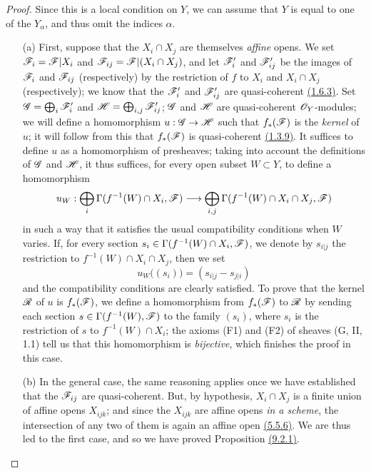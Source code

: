 \begin{proof}
\label{proof-prop-1.9.2.1}
Since this is a local condition on $Y$, we can assume that $Y$ is equal to one
of the $Y_\alpha$, and thus omit the indices $\alpha$.

\begin{itemize}
  \item[(a)] First, suppose that the $X_i\cap X_j$
    are themselves {\em affine} opens. We set $\mathscr{F}_i=\mathscr{F}|X_i$ and
    $\mathscr{F}_{ij}=\mathscr{F}|(X_i\cap X_j)$, and let $\mathscr{F}'_i$ and
    $\mathscr{F}'_{ij}$ be the images of $\mathscr{F}_i$ and $\mathscr{F}_{ij}$
    (respectively) by the restriction of $f$ to $X_i$ and $X_i\cap X_j$
    (respectively); we know that the $\mathscr{F}'_i$ and $\mathscr{F}'_{ij}$ are
    quasi-coherent \hyperref[prop-1.1.6.3]{(1.6.3)}. Set $\mathscr{G}=\bigoplus_i\mathscr{F}'_i$ and
    $\mathscr{H}=\bigoplus_{i,j}\mathscr{F}'_{ij}$; $\mathscr{G}$ and $\mathscr{H}$ are
    quasi-coherent $\mathscr{O}_Y$-modules; we will define a homomorphism
    $u:\mathscr{G}\to\mathscr{H}$ such that $f_*(\mathscr{F})$ is the
    {\em kernel} of $u$; it will follow from this that $f_*(\mathscr{F})$ is
    quasi-coherent \hyperref[cor-1.1.3.9]{(1.3.9)}. It suffices to define $u$ as
    a homomorphism of presheaves; taking into account the definitions of $\mathscr{G}$
    and $\mathscr{H}$, it thus suffices, for every open subset $W\subset Y$, to define a
    homomorphism
    \[
      u_W:\bigoplus_i\Gamma(f^{-1}(W)\cap X_i,\mathscr{F})
      \longrightarrow\bigoplus_{i,j}\Gamma(f^{-1}(W)\cap X_i\cap X_j,\mathscr{F})
    \]
    in such a way that it satisfies the usual compatibility conditions when $W$
    varies. If, for every section $s_i\in\Gamma(f^{-1}(W)\cap X_i,\mathscr{F})$, we
    denote by $s_{i|j}$ the restriction to $f^{-1}(W)\cap X_i\cap X_j$, then we set
    \[
      u_W\big((s_i)\big)=(s_{i|j}-s_{j|i})
    \]
    and the compatibility conditions are clearly satisfied. To prove that the kernel
    $\mathscr{R}$ of $u$ is $f_*(\mathscr{F})$, we define a homomorphism from $f_*(\mathscr{F})$ to
    $\mathscr{R}$ by sending each section $s\in\Gamma(f^{-1}(W),\mathscr{F})$ to the family
    $(s_i)$, where $s_i$ is the restriction of $s$ to $f^{-1}(W)\cap X_i$; the
    axioms (F1) and (F2) of sheaves (G, II, 1.1) tell us that this homomorphism is
    {\em bijective}, which finishes the proof in this case.
  \item[(b)] In the general case, the same reasoning applies once we have established that
    the $\mathscr{F}_{ij}$ are quasi-coherent. But, by hypothesis, $X_i\cap X_j$ is a
    finite union of affine opens $X_{ijk}$; and since the $X_{ijk}$ are affine opens
    {\em in a scheme}, the intersection of any two of them is again an affine open
    \hyperref[env-1.5.5.6]{(5.5.6)}. We are thus led to the first case, and so we have proved
    Proposition \hyperref[prop-1.9.2.1]{(9.2.1)}.
\end{itemize}
\end{proof}

